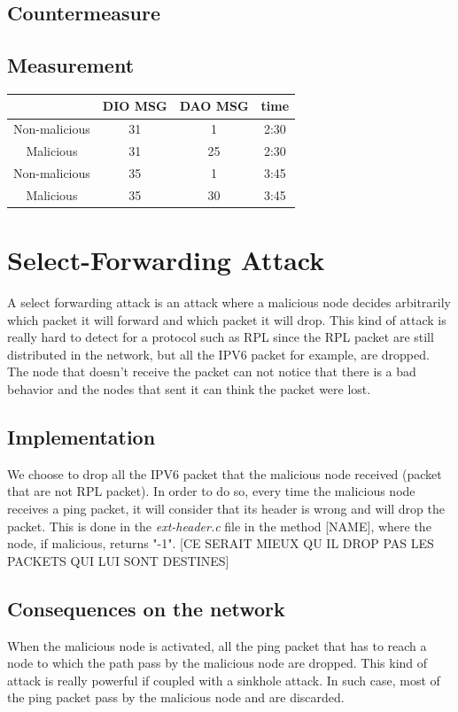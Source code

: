 \documentclass{report}
\begin{document}
\subsection*{Countermeasure}

\subsection*{Measurement}

\begin{tabular}{|c|c|c|c|}
\hline
&DIO MSG & DAO MSG&time\\
\hline
Non-malicious&31&1&2:30\\
\hline
Malicious&31&25&2:30\\
\hline
Non-malicious&35&1&3:45\\%
\hline
Malicious&35&30&3:45\\
\hline

\end{tabular}
\section{Select-Forwarding Attack}
A select forwarding attack is an attack where a malicious node decides arbitrarily which packet it will forward and which packet it will drop. This kind of attack is really hard to detect for a protocol such as RPL since the RPL packet are still distributed in the network, but all the IPV6 packet for example, are dropped. The node that doesn't receive the packet can not notice that there is a bad behavior and the nodes that sent it can think the packet were lost. 
\subsection*{Implementation}
We choose to drop all the IPV6 packet that the malicious node received (packet that are not RPL packet). In order to do so, every time the malicious node receives a ping packet, it will consider that its header is wrong and will drop the packet. This is done in the \textit{ext-header.c} file in the method [NAME], where the node, if malicious, returns "-1".  [CE SERAIT MIEUX QU IL DROP PAS LES PACKETS QUI LUI SONT DESTINES]
\subsection*{Consequences on the network}
When the malicious node is activated, all the ping packet that has to reach a node to which the path pass by the malicious node are dropped. This kind of attack is really powerful if coupled with a sinkhole attack. In such case, most of the ping packet pass by the malicious node and are discarded. 
\end{document}
